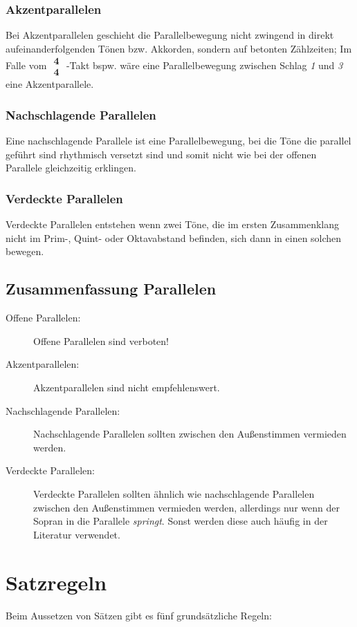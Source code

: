 \documentclass[a4paper]{article}
\begin{document}
	\subsubsection{Akzentparallelen}
	Bei Akzentparallelen geschieht die Parallelbewegung nicht zwingend in direkt aufeinanderfolgenden Tönen bzw. Akkorden, sondern auf betonten Zählzeiten; Im Falle vom $\substack{\mathbf{4}\\ \mathbf{4}}$ -Takt bspw. wäre eine Parallelbewegung zwischen Schlag \textit{1} und \textit{3} eine Akzentparallele.
	
	\subsubsection{Nachschlagende Parallelen}
	Eine nachschlagende Parallele ist eine Parallelbewegung, bei die Töne die parallel geführt sind rhythmisch versetzt sind und somit nicht wie bei der offenen Parallele gleichzeitig erklingen.
	
	\subsubsection{Verdeckte Parallelen}
	Verdeckte Parallelen entstehen wenn zwei Töne, die im ersten Zusammenklang nicht im Prim-, Quint- oder Oktavabstand befinden, sich dann in einen solchen bewegen.
	
	\subsection{Zusammenfassung Parallelen}
	\begin{description}
		\item[Offene Parallelen:] Offene Parallelen sind verboten!
		\item[Akzentparallelen:] Akzentparallelen sind nicht empfehlenswert.
		\item[Nachschlagende Parallelen:] Nachschlagende Parallelen sollten zwischen den Außenstimmen vermieden werden.
		\item[Verdeckte Parallelen:] Verdeckte Parallelen sollten ähnlich wie nachschlagende Parallelen zwischen den Außenstimmen vermieden werden, allerdings nur wenn der Sopran in die Parallele \textit{springt}. Sonst werden diese auch häufig in der Literatur verwendet.
	\end{description}

	\section{Satzregeln}
	Beim Aussetzen von Sätzen gibt es fünf grundsätzliche Regeln:
\end{document}
